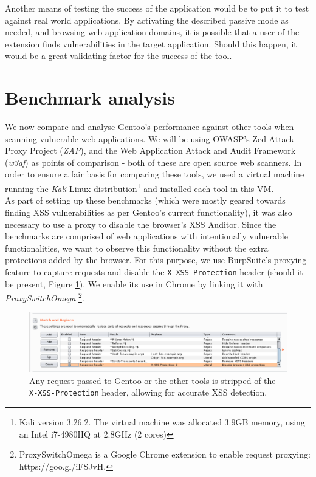 Another means of testing the success of the application would be to put it to test against real world applications. By activating the described passive mode as needed, and browsing web application domains, it is possible that a user of the extension finds vulnerabilities in the target application. Should this happen, it would be a great validating factor for the success of the tool.


\section{Benchmark analysis}

We now compare and analyse Gentoo's performance against other tools when scanning vulnerable web applications. We will be using OWASP's Zed Attack Proxy Project (\textit{ZAP}), and the Web Application Attack and Audit Framework (\textit{w3af}) as points of comparison - both of these are open source web scanners. In order to ensure a fair basis for comparing these tools, we used a virtual machine running the \textit{Kali} Linux distribution\footnote{ Kali version 3.26.2. The virtual machine was allocated 3.9GB memory, using an Intel i7-4980HQ at 2.8GHz (2 cores)} and installed each tool in this VM. \\

 As part of setting up these benchmarks (which were mostly geared towards finding XSS vulnerabilities as per Gentoo's current functionality), it was also necessary to use a proxy to disable the browser's XSS Auditor. Since the benchmarks are comprised of web applications with intentionally vulnerable functionalities, we want to observe this functionality without the extra protections added by the browser. For this purpose, we use BurpSuite's proxying feature to capture requests and disable the \texttt{X-XSS-Protection} header (should it be present, Figure \ref{fig:burp_xss_disabled}). We enable its use in Chrome by linking it with \textit{ProxySwitchOmega} \footnote{ ProxySwitchOmega is a Google Chrome extension to enable request proxying: https://goo.gl/iFSJvH.}. \\

\begin{figure}[h]
	\centering
	\includegraphics[width=\textwidth]{images/evaluation/burp_xss_disabled.png}
	\caption{Any request passed to Gentoo or the other tools is stripped of the \texttt{X-XSS-Protection} header, allowing for accurate XSS detection.}
	\label{fig:burp_xss_disabled}
\end{figure}

